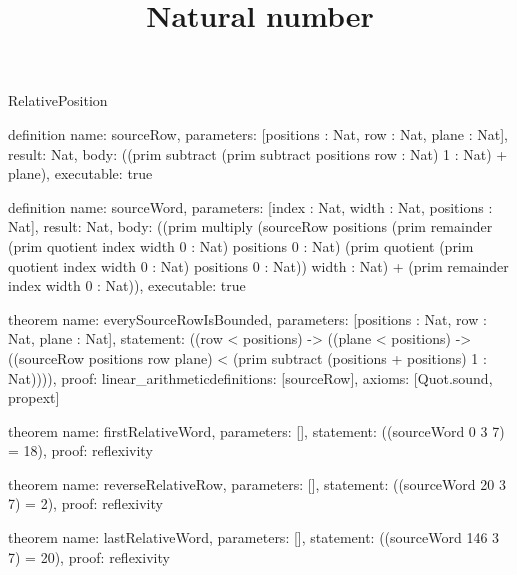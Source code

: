 \begin{lexlean}{RelativePosition}
\title{Natural number}
\begin{semanticmodule}
definition{
  name: sourceRow,
  parameters: [positions : Nat, row : Nat, plane : Nat],
  result: Nat,
  body: ((prim subtract (prim subtract positions row : Nat) 1 : Nat) + plane),
  executable: true
}

definition{
  name: sourceWord,
  parameters: [index : Nat, width : Nat, positions : Nat],
  result: Nat,
  body: ((prim multiply (sourceRow positions (prim remainder (prim quotient index width 0 : Nat) positions 0 : Nat) (prim quotient (prim quotient index width 0 : Nat) positions 0 : Nat)) width : Nat) + (prim remainder index width 0 : Nat)),
  executable: true
}

theorem{
  name: everySourceRowIsBounded,
  parameters: [positions : Nat, row : Nat, plane : Nat],
  statement: ((row < positions) -> ((plane < positions) -> ((sourceRow positions row plane) < (prim subtract (positions + positions) 1 : Nat)))),
  proof: linear_arithmetic{definitions: [sourceRow]},
  axioms: [Quot.sound, propext]
}

theorem{
  name: firstRelativeWord,
  parameters: [],
  statement: ((sourceWord 0 3 7) = 18),
  proof: reflexivity{}
}

theorem{
  name: reverseRelativeRow,
  parameters: [],
  statement: ((sourceWord 20 3 7) = 2),
  proof: reflexivity{}
}

theorem{
  name: lastRelativeWord,
  parameters: [],
  statement: ((sourceWord 146 3 7) = 20),
  proof: reflexivity{}
}
\end{semanticmodule}
\end{lexlean}
